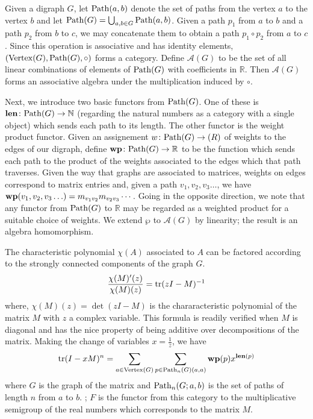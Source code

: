 Given a digraph $G$, let $\mathrm{Path} (a,b)$ denote the set of paths from the
vertex $a$ to the vertex $b$ and let $\mathrm{Path}(G) = \bigcup_{a,b \in G} \mathrm{Path} (a,b)$.
Given a path $p_1$ from $a$ to $b$ and a path $p_2$ from $b$ to $c$, we may
concatenate them to obtain a path $p_1 \circ p_2$ from $a$ to $c$.  Since
this operation is associative and has identity elements,
$(\mathrm{Vertex}(G), \mathrm{Path}(G), \circ)$ forms a category.  Define
$\mathcal{A}(G)$ to be the set of all linear combinations of elements of
$\mathrm{Path}(G)$ with coefficients in $\mathbb{R}$.  Then $\mathcal{A}(G)$ forms
an associative algebra under the multiplication induced by $\circ$.

Next, we introduce two basic functors from $\mathrm{Path} (G)$.  One of these is
$\mathbf{len} \colon \mathrm{Path}(G) \to \mathbb{N}$ (regarding the natural numbers
as a category with a single object) which sends each path to its length.
The other functor is the weight product functor.  Given an assignement
$w \colon \mathrm{Path}(G) \to \mathbb(R)$ of weights to the edges of our digraph,
define $\mathbf{wp} \colon \mathrm{Path}(G) \to \mathbb{R}$ to be the function which sends
each path to the product of the weights associated to the edges which
that path traverses.  Given the way that graphs are associated to matrices,
weights on edges correspond to matrix entries and, given a path
$v_1, v_2, v_3 \ldots$, we have $\mathbf{wp}(v_1, v_2, v_3 \ldots) =
m_{v_1 v_2} m_{v_2 v_3} \cdots$.  Going in the opposite direction, we
note that any functor from $\mathrm{Path}(G)$ to $\mathbb{R}$ may be regarded as
a weighted product for a suitable choice of weights.  We extend $\wp$ to
$\mathcal{A}(G)$ by linearity; the result is an algebra homomorphism.



The characteristic polynomial $\chi(A)$ associated to $A$ can be factored
according to the strongly connected components of the graph $G$.
\[
\frac{\chi(M)'(z)}{\chi(M)(z)} = \mathrm{tr} (zI - M)^{-1}
\]
where, $\chi(M)(z) = \det (zI - M)$ is the chararacteristic polynomial of the
matrix $M$ with $z$ a complex variable.  This formula is readily verified when
$M$ is diagonal and has the nice property of being additive over decompositions
of the matrix. Making the change of variables $x=\frac{1}{z}$, we have
\[
\mathrm{tr} (I - xM)^n =
\sum_{a \in \mathrm{Vertex}(G)} \sum_{p \in \mathrm{Path}_n (G)(a,a)} \mathbf{wp}(p) x^{\mathbf{len}(p)}
\]
where $G$ is the graph of the matrix and $\mathrm{Path}_n (G;a,b)$ is the set of
paths of length $n$ from $a$ to $b$.  ; $F$ is the functor from this category
to the multiplicative semigroup of the real numbers which corresponds to the matrix $M$.

